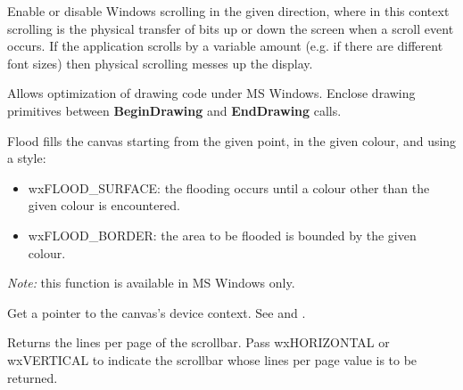 
Enable or disable Windows scrolling in the given direction, where in
this context scrolling is the physical transfer of bits up or down the
screen when a scroll event occurs. If the application scrolls by a
variable amount (e.g. if there are different font sizes) then physical
scrolling messes up the display.



Allows optimization of drawing code under MS Windows. Enclose
drawing primitives between {\bf BeginDrawing} and {\bf EndDrawing}\rtfsp
calls.



Flood fills the canvas starting from the given point, in the given colour,
and using a style:

\begin{itemize}\itemsep=0pt
\item wxFLOOD\_SURFACE: the flooding occurs until a colour other than the given colour is encountered.
\item wxFLOOD\_BORDER: the area to be flooded is bounded by the given colour.
\end{itemize}

{\it Note:} this function is available in MS Windows only.

\label{wxcanvasgetdc}


Get a pointer to the canvas's device context. See 
and .

\label{wxcanvasgetscrollpage}


Returns the lines per page of the scrollbar. Pass wxHORIZONTAL or wxVERTICAL
to indicate the scrollbar whose lines per page value is to be returned.

\label{wxcanvasgetscrollpixels}


